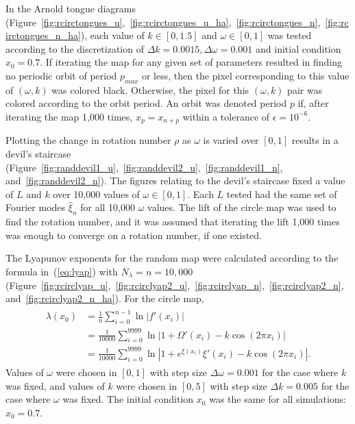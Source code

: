 In the Arnold tongue diagrams 
(Figure~\ref{fig:rcirctongues_u},~\ref{fig:rcirctongues_u_ha},~\ref{fig:rcirctongues_n},~\ref{fig:rcirctongues_n_ha}), each value of $k \in
[0,1.5]$ and $\omega \in [0,1]$ was tested according to the
discretization of $\Delta k=0.0015, \Delta \omega = 0.001$ and initial
condition $x_0=0.7$. If iterating the map for any given set of
parameters resulted in finding no periodic orbit of period $p_{max}$
or less, then the pixel corresponding to this value of $(\omega, k)$
was colored black. Otherwise, the pixel for this $(\omega, k)$ pair was colored
according to the orbit period. An orbit was
denoted period $p$ if, after iterating the map 1,000 times,
$x_p=x_{n+p}$ within a tolerance of $\epsilon = 10^{-6}$.

Plotting the change in rotation number $\rho$ as $\omega$ is varied over
$[0,1]$ results in a devil's staircase
(Figure~\ref{fig:randdevil1_u},~\ref{fig:randdevil2_u},~\ref{fig:randdevil1_n},
and~\ref{fig:randdevil2_n}). The figures relating to the
devil's staircase fixed a value of $L$ and $k$ over 10,000 values of
$\omega \in [0,1]$. Each $L$ tested had the same set of Fourier
modes $\hat{\xi}_n$ for all 10,000 $\omega$ values. The lift of the circle map was used to find the
rotation number, and it was assumed that iterating the lift 1,000
times was enough to converge on a rotation number, if one existed. 

The Lyapunov exponents for the random map were calculated according to
the formula in~(\ref{eq:lyap}) with $N_\lambda=n=10,000$
(Figure~\ref{fig:rcirclyap_u},~\ref{fig:rcirclyap2_u},~\ref{fig:rcirclyap_n},~\ref{fig:rcirclyap2_n},
and~\ref{fig:rcirclyap2_n_ha}). For the circle map, 
\begin{align}
\begin{split}
\lambda(x_0) &= \frac{1}{n} \sum_{i=0}^{n-1} \ln |f'(x_i)|\\
&= \frac{1}{10000} \sum_{i=0}^{9999} \ln |1 + \Omega'(x_i) - k\cos(2\pi x_i)|\\
&= \frac{1}{10000} \sum_{i=0}^{9999} \ln |1+e^{\xi(x_i)}\xi'(x_i)- k\cos(2\pi x_i)|.
\end{split}
\end{align}
Values of $\omega$ were chosen in $[0,1]$ with step size $\Delta \omega
= 0.001$ for the case where $k$ was fixed, and values of $k$ were
chosen in $[0,5]$ with step size $\Delta k = 0.005$ for the case where
$\omega$ was fixed. The initial condition $x_0$ was the same for all
simulations: $x_0=0.7$.


